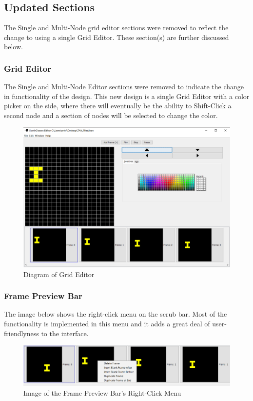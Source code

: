 \documentclass[12pt]{article}
\begin{document}
\begin{appendices}
      \subsection{Updated Sections}
        The Single and Multi-Node grid editor sections were removed to reflect the change to using a single Grid Editor. These section(s) are further discussed below.
      
        \subsubsection {Grid Editor}
          The Single and Multi-Node Editor sections were removed to indicate the change in functionality of the design. This new design is a single Grid Editor with a color picker on the side, where there will eventually be the ability to Shift-Click a second node and a section of nodes will be selected to change the color.
      
        \begin{figure}[ht!]
          \centering
          \includegraphics[width=.6\linewidth]{gridEditor.PNG}
          \caption{Diagram of Grid Editor}
        \end{figure}
      
      
        \subsubsection {Frame Preview Bar}
          The image below shows the right-click menu on the scrub bar. Most of the functionality is implemented in this menu and it adds a great deal of user-friendlyness to the interface.
        
        \begin{figure}[ht!]
          \centering
          \includegraphics[width=.8\linewidth]{rtClick.PNG}
          \caption{Image of the Frame Preview Bar's Right-Click Menu}
        \end{figure}
      

\end{appendices}
\end{document}
